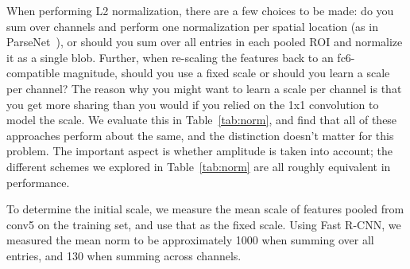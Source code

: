 \documentclass[10pt,twocolumn,letterpaper]{article}
\begin{document}
When performing L2 normalization, there are a few choices to be made: do you
sum over channels and perform one normalization per spatial location (as in
ParseNet~\cite{parsenet}), or should you sum over all entries in each pooled ROI
and normalize it as a single blob.  Further, when re-scaling the features back
to an fc6-compatible magnitude, should you use a fixed scale or should you learn a
scale per channel?  The reason why you might want to learn a scale per channel
is that you get more sharing than you would if you relied on the 1x1 convolution
to model the scale.  We evaluate this in Table~\ref{tab:norm}, and find that all
of these approaches perform about the same, and the distinction doesn't matter
for this problem.  The important aspect is whether amplitude is taken into
account; the different schemes we explored in Table~\ref{tab:norm} are all
roughly equivalent in performance.

To determine the initial scale, we measure the mean scale of features pooled
from conv5 on the training set, and use that as the fixed scale.  Using Fast
R-CNN, we measured the mean norm to be approximately 1000 when summing over all
entries, and 130 when summing across channels.
\end{document}
